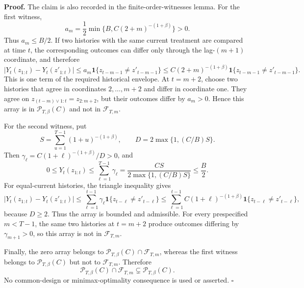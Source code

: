 \textbf{Proof.} The claim is also recorded in the finite-order-witnesses lemma. For the first witness,
\[
a_m=\frac12\min\{B,C(2+m)^{-(1+\beta)}\}>0.
\]
Thus \(a_m\le B/2\). If two histories with the same current treatment are compared at time \(t\), the corresponding outcomes can differ only through the lag-\((m+1)\) coordinate, and therefore
\[
\left|Y_t(z_{1:t})-Y_t(z'_{1:t})\right|
\le a_m\mathbf 1\{z_{t-m-1}\ne z'_{t-m-1}\}
\le C(2+m)^{-(1+\beta)}
\mathbf 1\{z_{t-m-1}\ne z'_{t-m-1}\}.
\]
This is one term of the required historical envelope. At \(t=m+2\), choose two histories that agree in coordinates \(2,\ldots,m+2\) and differ in coordinate one. They agree on \(z_{(t-m)\vee1:t}=z_{2:m+2}\), but their outcomes differ by \(a_m>0\). Hence this array is in \(\mathcal P_{T,\beta}(C)\) and not in \(\mathcal F_{T,m}\).

For the second witness, put
\[
S=\sum_{u=1}^{T-1}(1+u)^{-(1+\beta)},
\qquad
D=2\max\{1,(C/B)S\}.
\]
Then \(\gamma_\ell=C(1+\ell)^{-(1+\beta)}/D>0\), and
\[
0\le Y_t(z_{1:t})
\le\sum_{\ell=1}^{T-1}\gamma_\ell
=\frac{CS}{2\max\{1,(C/B)S\}}
\le\frac B2.
\]
For equal-current histories, the triangle inequality gives
\[
\left|Y_t(z_{1:t})-Y_t(z'_{1:t})\right|
\le\sum_{\ell=1}^{t-1}\gamma_\ell
\mathbf1\{z_{t-\ell}\ne z'_{t-\ell}\}
\le\sum_{\ell=1}^{t-1}C(1+\ell)^{-(1+\beta)}
\mathbf1\{z_{t-\ell}\ne z'_{t-\ell}\},
\]
because \(D\ge2\). Thus the array is bounded and admissible. For every prespecified \(m<T-1\), the same two histories at \(t=m+2\) produce outcomes differing by \(\gamma_{m+1}>0\), so this array is not in \(\mathcal F_{T,m}\).

Finally, the zero array belongs to \(\mathcal P_{T,\beta}(C)\cap\mathcal F_{T,m}\), whereas the first witness belongs to \(\mathcal P_{T,\beta}(C)\) but not to \(\mathcal F_{T,m}\). Therefore
\[
\mathcal P_{T,\beta}(C)\cap\mathcal F_{T,m}
\subsetneq\mathcal P_{T,\beta}(C).
\]
No common-design or minimax-optimality consequence is used or asserted. \(\square\)